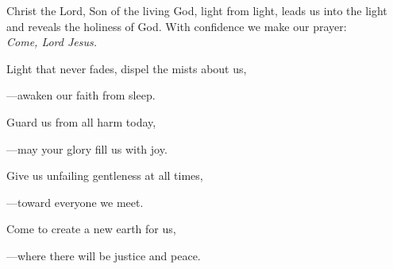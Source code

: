 \intercessions\indent

\begin{hangpar}

Christ the Lord, Son of the living God, light from light, leads us into the light and reveals the holiness of God. With confidence we make our prayer:\\
\emph{Come, Lord Jesus.}

\medskip Light that never fades, dispel the mists about us,

{\color{red}---\thinspace}awaken our faith from sleep.

\medskip Guard us from all harm today,

{\color{red}---\thinspace}may your glory fill us with joy.

\medskip Give us unfailing gentleness at all times,

{\color{red}---\thinspace}toward everyone we meet.

\medskip Come to create a new earth for us,

{\color{red}---\thinspace}where there will be justice and peace.

\end{hangpar}
